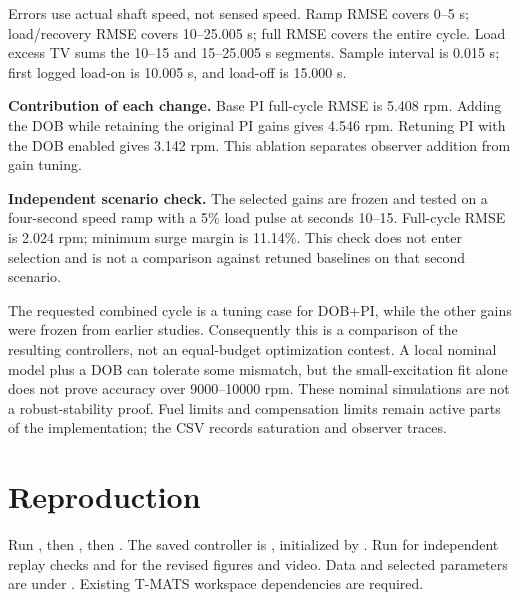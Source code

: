 \documentclass[11pt,a4paper]{article}
\begin{document}
Errors use actual shaft speed, not sensed speed. Ramp RMSE covers 0--5 s; load/recovery RMSE covers 10--25.005 s; full RMSE covers the entire cycle. Load excess TV sums the 10--15 and 15--25.005 s segments. Sample interval is 0.015 s; first logged load-on is 10.005 s, and load-off is 15.000 s.

\textbf{Contribution of each change.} Base PI full-cycle RMSE is 5.408 rpm. Adding the DOB while retaining the original PI gains gives 4.546 rpm. Retuning PI with the DOB enabled gives 3.142 rpm. This ablation separates observer addition from gain tuning.

\textbf{Independent scenario check.} The selected gains are frozen and tested on a four-second speed ramp with a 5\% load pulse at seconds 10--15. Full-cycle RMSE is 2.024 rpm; minimum surge margin is 11.14\%. This check does not enter selection and is not a comparison against retuned baselines on that second scenario.

The requested combined cycle is a tuning case for DOB+PI, while the other gains were frozen from earlier studies. Consequently this is a comparison of the resulting controllers, not an equal-budget optimization contest. A local nominal model plus a DOB can tolerate some mismatch, but the small-excitation fit alone does not prove accuracy over 9000--10000 rpm. These nominal simulations are not a robust-stability proof. Fuel limits and compensation limits remain active parts of the implementation; the CSV records saturation and observer traces.
\section{Reproduction}
Run , then , then . The saved controller is , initialized by . Run  for independent replay checks and  for the revised figures and video. Data and selected parameters are under . Existing T-MATS workspace dependencies are required.
\end{document}
